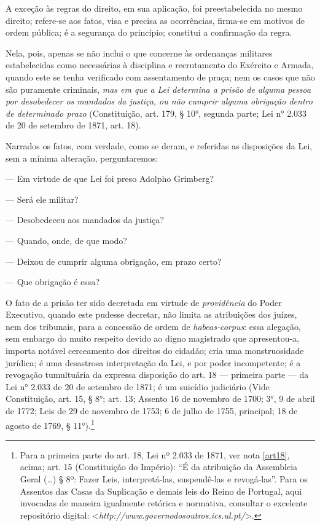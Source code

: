 A exceção às regras do direito, em sua aplicação, foi preestabelecida no
mesmo direito; refere-se aos fatos, visa e precisa as ocorrências,
firma-se em motivos de ordem pública; é a segurança do princípio;
constitui a confirmação da regra.

Nela, pois, apenas se não inclui o que concerne às ordenanças militares
estabelecidas como necessárias à disciplina e recrutamento do Exército e
Armada, quando este se tenha verificado com assentamento de praça; nem
os casos que não são puramente criminais, \emph{mas em que a Lei
determina a prisão de alguma pessoa por desobedecer os mandados da
justiça, ou não cumprir alguma obrigação dentro de determinado prazo}
(Constituição, art. 179, § 10°, segunda parte; Lei n° 2.033 de 20
de setembro de 1871, art. 18).

Narrados os fatos, com verdade, como se deram, e referidas as
disposições da Lei, sem a mínima alteração, perguntaremos:

--- Em virtude de que Lei foi preso Adolpho Grimberg?

--- Será ele militar?

--- Desobedeceu aos mandados da justiça?

--- Quando, onde, de que modo?

--- Deixou de cumprir alguma obrigação, em prazo certo?

--- Que obrigação é essa?

\asterisc

O fato de a prisão ter sido decretada em virtude de \emph{providência}
do Poder Executivo, quando este pudesse decretar, não limita as
atribuições dos juízes, nem dos tribunais, para a concessão de ordem de
\emph{habeas-corpus}: essa alegação, sem embargo do muito respeito
devido ao digno magistrado que apresentou-a, importa notável cerceamento
dos direitos do cidadão; cria uma monstruosidade jurídica; é uma
desastrosa interpretação da Lei, e por poder incompetente; é a revogação
tumultuária da expressa disposição do art. 18 --- primeira parte --- da
Lei n° 2.033 de 20 de setembro de 1871; é um suicídio judiciário
(Vide Constituição, art. 15, § 8°; art. 13; Assento 16
de novembro de 1700; 3°, 9 de abril de 1772; Leis de 29 de novembro de
1753; 6 de julho de 1755, principal; 18 de agosto de 1769, §
11°).\footnote{Para a primeira parte do art. 18, Lei nº 2.033 de 1871,
  ver nota \ref{art18}, acima; art. 15 (Constituição do Império): ``É da atribuição da
  Assembleia Geral (\ldots{}) § 8º: Fazer Leis, interpretá-las, suspendê-las \label{art15}
  e revogá-las''. Para os Assentos das Casas da Suplicação e demais leis do Reino de Portugal, aqui invocadas de maneira igualmente retórica e
  normativa, consultar o excelente repositório digital:
  \textless{}\emph{http://www.governodosoutros.ics.ul.pt/}\textgreater{}.}

